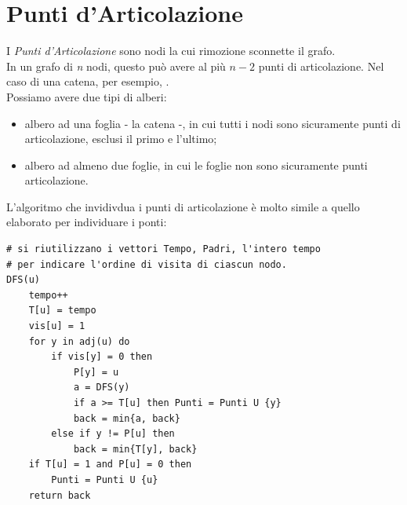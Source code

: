 \section{Punti d'Articolazione}
I \textit{Punti d'Articolazione} sono nodi la cui rimozione sconnette il grafo. \\
In un grafo di \textit{n} nodi, questo può avere al più $n-2$ punti di articolazione. Nel caso di una catena, per esempio, . \\
Possiamo avere due tipi di alberi:
\begin{itemize}
    \item albero ad una foglia - la catena -, in cui tutti i nodi sono sicuramente punti di articolazione, esclusi il primo e l'ultimo;
    \item albero ad almeno due foglie, in cui le foglie non sono sicuramente punti articolazione.
\end{itemize}
L'algoritmo che invidivdua i punti di articolazione è molto simile a quello elaborato per individuare i ponti:
\begin{lstlisting}
# si riutilizzano i vettori Tempo, Padri, l'intero tempo
# per indicare l'ordine di visita di ciascun nodo.
DFS(u)
    tempo++
    T[u] = tempo
	vis[u] = 1 
	for y in adj(u) do
		if vis[y] = 0 then
			P[y] = u
			a = DFS(y)
			if a >= T[u] then Punti = Punti U {y}
			back = min{a, back}
		else if y != P[u] then
		    back = min{T[y], back}
    if T[u] = 1 and P[u] = 0 then
        Punti = Punti U {u}
    return back
\end{lstlisting}

